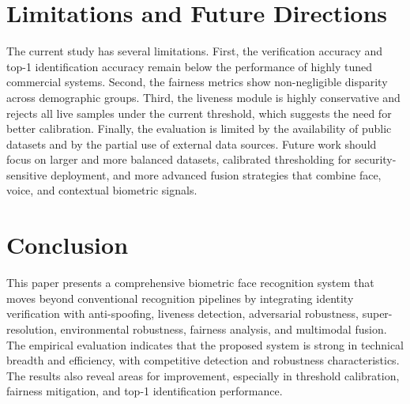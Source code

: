 \documentclass[conference]{IEEEtran}
\begin{document}
\section{Limitations and Future Directions}
The current study has several limitations. First, the verification accuracy and top-1 identification accuracy remain below the performance of highly tuned commercial systems. Second, the fairness metrics show non-negligible disparity across demographic groups. Third, the liveness module is highly conservative and rejects all live samples under the current threshold, which suggests the need for better calibration. Finally, the evaluation is limited by the availability of public datasets and by the partial use of external data sources. Future work should focus on larger and more balanced datasets, calibrated thresholding for security-sensitive deployment, and more advanced fusion strategies that combine face, voice, and contextual biometric signals.

\section{Conclusion}
This paper presents a comprehensive biometric face recognition system that moves beyond conventional recognition pipelines by integrating identity verification with anti-spoofing, liveness detection, adversarial robustness, super-resolution, environmental robustness, fairness analysis, and multimodal fusion. The empirical evaluation indicates that the proposed system is strong in technical breadth and efficiency, with competitive detection and robustness characteristics. The results also reveal areas for improvement, especially in threshold calibration, fairness mitigation, and top-1 identification performance.
\end{document}
